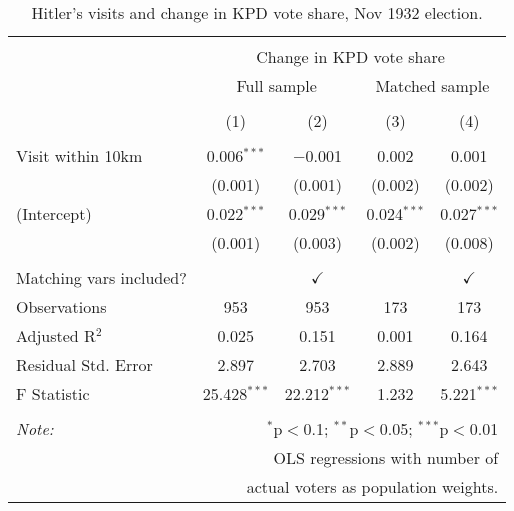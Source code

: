 
\begin{table}[!htbp] \centering 
  \caption{Hitler's visits and change in KPD vote share, Nov 1932 election.} 
  \label{tab:ols-d_p_kpd-3} 
\begin{tabular}{@{\extracolsep{5pt}}lcccc} 
\\[-1.8ex]\hline 
\hline \\[-1.8ex] 
 & \multicolumn{4}{c}{Change in KPD vote share} \\ 
\cline{2-5} 
 & \multicolumn{2}{c}{Full sample} & \multicolumn{2}{c}{Matched sample} \\ 
\\[-1.8ex] & (1) & (2) & (3) & (4)\\ 
\hline \\[-1.8ex] 
 Visit within 10km & 0.006$^{***}$ & $-$0.001 & 0.002 & 0.001 \\ 
  & (0.001) & (0.001) & (0.002) & (0.002) \\ 
  (Intercept) & 0.022$^{***}$ & 0.029$^{***}$ & 0.024$^{***}$ & 0.027$^{***}$ \\ 
  & (0.001) & (0.003) & (0.002) & (0.008) \\ 
 \hline \\[-1.8ex] 
Matching vars included? &  & \multicolumn{1}{c}{$\checkmark$} &  & \multicolumn{1}{c}{$\checkmark$} \\ 
Observations & 953 & 953 & 173 & 173 \\ 
Adjusted R$^{2}$ & 0.025 & 0.151 & 0.001 & 0.164 \\ 
Residual Std. Error & 2.897 & 2.703 & 2.889 & 2.643 \\ 
F Statistic & 25.428$^{***}$ & 22.212$^{***}$ & 1.232 & 5.221$^{***}$ \\ 
\hline 
\hline \\[-1.8ex] 
\textit{Note:}  & \multicolumn{4}{r}{$^{*}$p$<$0.1; $^{**}$p$<$0.05; $^{***}$p$<$0.01} \\ 
 & \multicolumn{4}{r}{OLS regressions with number of} \\ 
 & \multicolumn{4}{r}{actual voters as population weights.} \\ 
\end{tabular} 
\end{table} 
